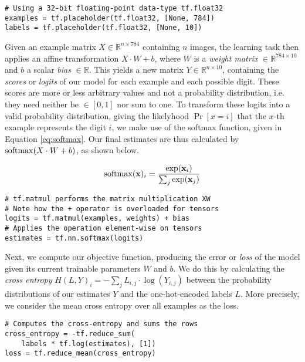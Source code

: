 \begin{lstlisting}
# Using a 32-bit floating-point data-type tf.float32
examples = tf.placeholder(tf.float32, [None, 784])
labels = tf.placeholder(tf.float32, [None, 10])
\end{lstlisting}

Given an example matrix $X \in \mathbb{R}^{n \times 784}$ containing $n$ images,
the learning task then applies an affine transformation $X \cdot W + b$, where
$W$ is a \emph{weight matrix} $\in \mathbb{R}^{784 \times 10}$ and $b$ a scalar
\emph{bias} $\in \mathbb{R}$. This yields a new matrix
$Y \in \mathbb{R}^{n \times 10}$, containing the \emph{scores} or \emph{logits}
of our model for each example and each possible digit. These scores are more or
less arbitrary values and not a probability distribution, i.e. they need neither
be $\in [0, 1]$ nor sum to one. To transform these logits into a valid
probability distribution, giving the likelyhood $\Pr[x = i]$ that the $x$-th
example represents the digit $i$, we make use of the softmax function, given in
Equation \ref{eq:softmax}. Our final estimates are thus calculated by
$\operatorname*{softmax}(X \cdot W + b)$, as shown below.

\begin{equation}\label{eq:softmax}
  \operatorname*{softmax}(\mathbf{x})_i = \frac{\exp(\mathbf{x}_i)}{\sum_j \exp(\mathbf{x}_j)}
\end{equation}

\begin{lstlisting}
# tf.matmul performs the matrix multiplication XW
# Note how the + operator is overloaded for tensors
logits = tf.matmul(examples, weights) + bias
# Applies the operation element-wise on tensors
estimates = tf.nn.softmax(logits)
\end{lstlisting}

Next, we compute our objective function, producing the error or \emph{loss} of
the model given its current trainable parameters $W$ and $b$. We do this by
calculating the \emph{cross entropy}
$H(L, Y)_i = -\sum_j L_{i,j} \cdot \log(Y_{i,j})$ between the probability
distributions of our estimates $Y$ and the one-hot-encoded labels $L$. More
precisely, we consider the mean cross entropy over all examples as the loss.

\begin{lstlisting}
# Computes the cross-entropy and sums the rows
cross_entropy = -tf.reduce_sum(
    labels * tf.log(estimates), [1])
loss = tf.reduce_mean(cross_entropy)
\end{lstlisting}

